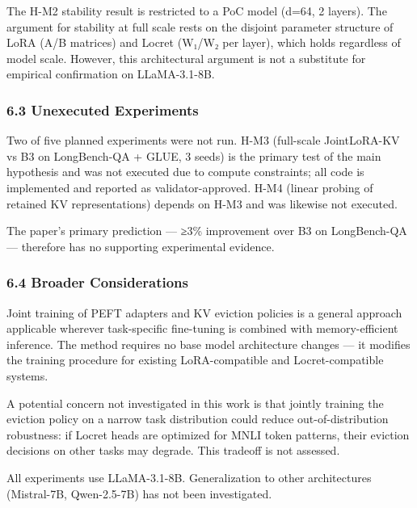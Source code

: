 The H-M2 stability result is restricted to a PoC model (d=64, 2 layers). The argument for stability at full scale rests on the disjoint parameter structure of LoRA (A/B matrices) and Locret (W₁/W₂ per layer), which holds regardless of model scale. However, this architectural argument is not a substitute for empirical confirmation on LLaMA-3.1-8B.

\subsubsection{6.3 Unexecuted Experiments}

Two of five planned experiments were not run. H-M3 (full-scale JointLoRA-KV vs B3 on LongBench-QA + GLUE, 3 seeds) is the primary test of the main hypothesis and was not executed due to compute constraints; all code is implemented and reported as validator-approved. H-M4 (linear probing of retained KV representations) depends on H-M3 and was likewise not executed.

The paper's primary prediction — ≥3\% improvement over B3 on LongBench-QA — therefore has no supporting experimental evidence.

\subsubsection{6.4 Broader Considerations}

Joint training of PEFT adapters and KV eviction policies is a general approach applicable wherever task-specific fine-tuning is combined with memory-efficient inference. The method requires no base model architecture changes — it modifies the training procedure for existing LoRA-compatible and Locret-compatible systems.

A potential concern not investigated in this work is that jointly training the eviction policy on a narrow task distribution could reduce out-of-distribution robustness: if Locret heads are optimized for MNLI token patterns, their eviction decisions on other tasks may degrade. This tradeoff is not assessed.

All experiments use LLaMA-3.1-8B. Generalization to other architectures (Mistral-7B, Qwen-2.5-7B) has not been investigated.

